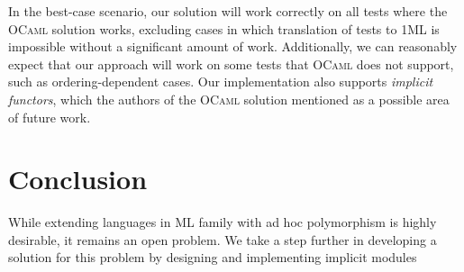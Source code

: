 \documentclass{spbau-diploma}
\begin{document}
In the best-case scenario, our solution will work correctly on all tests where the \textsc{OCaml} solution works, excluding cases in which translation of tests to \textsc{1ML} is impossible without a significant amount of work. Additionally, we can reasonably expect that our approach will work on some tests that \textsc{OCaml} does not support, such as ordering-dependent cases. Our implementation also supports \textit{implicit functors}, which the authors of the \textsc{OCaml} solution mentioned as a possible area of future work.

\section*{Conclusion}

While extending languages in \textsc{ML} family with ad hoc polymorphism is highly desirable, it remains an open problem. We take a step further in developing a solution for this problem by designing and implementing implicit modules 



\end{document}
